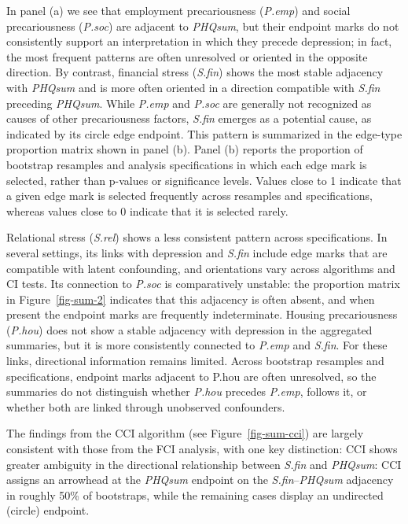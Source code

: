 \documentclass[
]{article}
\begin{document}
In panel (a) we see that employment precariousness (\textit{P.emp}) and
social precariousness (\textit{P.soc}) are adjacent to \emph{PHQsum},
but their endpoint marks do not consistently support an interpretation
in which they precede depression; in fact, the most frequent patterns
are often unresolved or oriented in the opposite direction. By contrast,
financial stress (\textit{S.fin}) shows the most stable adjacency with
\textit{PHQsum} and is more often oriented in a direction compatible
with \textit{S.fin} preceding \textit{PHQsum}. While \emph{P.emp} and
\emph{P.soc} are generally not recognized as causes of other
precariousness factors, \emph{S.fin} emerges as a potential cause, as
indicated by its circle edge endpoint. This pattern is summarized in the
edge-type proportion matrix shown in panel (b). Panel (b) reports the
proportion of bootstrap resamples and analysis specifications in which
each edge mark is selected, rather than p-values or significance levels.
Values close to 1 indicate that a given edge mark is selected frequently
across resamples and specifications, whereas values close to 0 indicate
that it is selected rarely.

Relational stress (\textit{S.rel}) shows a less consistent pattern
across specifications. In several settings, its links with depression
and \textit{S.fin} include edge marks that are compatible with latent
confounding, and orientations vary across algorithms and CI tests. Its
connection to \textit{P.soc} is comparatively unstable: the proportion
matrix in Figure~\ref{fig-sum-2} indicates that this adjacency is often
absent, and when present the endpoint marks are frequently
indeterminate. Housing precariousness (\textit{P.hou}) does not show a
stable adjacency with depression in the aggregated summaries, but it is
more consistently connected to \textit{P.emp} and \textit{S.fin}. For
these links, directional information remains limited. Across bootstrap
resamples and specifications, endpoint marks adjacent to P.hou are often
unresolved, so the summaries do not distinguish whether \textit{P.hou}
precedes \textit{P.emp}, follows it, or whether both are linked through
unobserved confounders.

The findings from the CCI algorithm (see Figure~\ref{fig-sum-cci}) are
largely consistent with those from the FCI analysis, with one key
distinction: CCI shows greater ambiguity in the directional relationship
between \emph{S.fin} and \emph{PHQsum}: CCI assigns an arrowhead at the
\textit{PHQsum} endpoint on the \textit{S.fin}--\textit{PHQsum}
adjacency in roughly 50\% of bootstraps, while the remaining cases
display an undirected (circle) endpoint.
\end{document}
